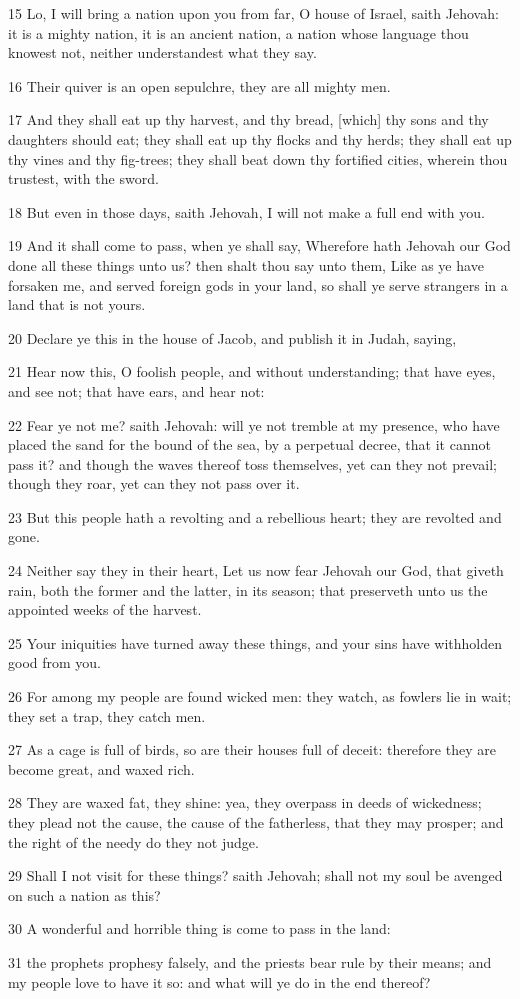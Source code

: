 \par 15 Lo, I will bring a nation upon you from far, O house of Israel, saith Jehovah: it is a mighty nation, it is an ancient nation, a nation whose language thou knowest not, neither understandest what they say.
\par 16 Their quiver is an open sepulchre, they are all mighty men.
\par 17 And they shall eat up thy harvest, and thy bread, [which] thy sons and thy daughters should eat; they shall eat up thy flocks and thy herds; they shall eat up thy vines and thy fig-trees; they shall beat down thy fortified cities, wherein thou trustest, with the sword.
\par 18 But even in those days, saith Jehovah, I will not make a full end with you.
\par 19 And it shall come to pass, when ye shall say, Wherefore hath Jehovah our God done all these things unto us? then shalt thou say unto them, Like as ye have forsaken me, and served foreign gods in your land, so shall ye serve strangers in a land that is not yours.
\par 20 Declare ye this in the house of Jacob, and publish it in Judah, saying,
\par 21 Hear now this, O foolish people, and without understanding; that have eyes, and see not; that have ears, and hear not:
\par 22 Fear ye not me? saith Jehovah: will ye not tremble at my presence, who have placed the sand for the bound of the sea, by a perpetual decree, that it cannot pass it? and though the waves thereof toss themselves, yet can they not prevail; though they roar, yet can they not pass over it.
\par 23 But this people hath a revolting and a rebellious heart; they are revolted and gone.
\par 24 Neither say they in their heart, Let us now fear Jehovah our God, that giveth rain, both the former and the latter, in its season; that preserveth unto us the appointed weeks of the harvest.
\par 25 Your iniquities have turned away these things, and your sins have withholden good from you.
\par 26 For among my people are found wicked men: they watch, as fowlers lie in wait; they set a trap, they catch men.
\par 27 As a cage is full of birds, so are their houses full of deceit: therefore they are become great, and waxed rich.
\par 28 They are waxed fat, they shine: yea, they overpass in deeds of wickedness; they plead not the cause, the cause of the fatherless, that they may prosper; and the right of the needy do they not judge.
\par 29 Shall I not visit for these things? saith Jehovah; shall not my soul be avenged on such a nation as this?
\par 30 A wonderful and horrible thing is come to pass in the land:
\par 31 the prophets prophesy falsely, and the priests bear rule by their means; and my people love to have it so: and what will ye do in the end thereof?

